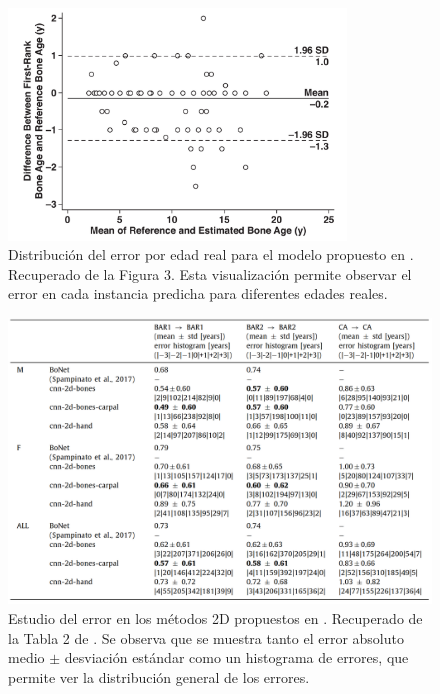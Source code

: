 \begin{figure}[h]
    \centering
    \includegraphics[width=0.8\textwidth]{capitulos/cap_03/imagenes/error_distribution.png}
    \caption[
        Distribución del error por edad real para el modelo propuesto en \cite{kim2017}. 
    ]{
        Distribución del error por edad real para el modelo propuesto en \cite{kim2017}. 
        Recuperado de la Figura 3. 
        Esta visualización permite observar el error en cada instancia predicha para diferentes edades reales. 
    }
    \label{fig:error_distribution_by_age}
\end{figure}

\begin{figure}[h]
    \centering
    \includegraphics[width=\textwidth]{capitulos/cap_03/imagenes/error_study.png}
    \caption[
        Estudio del error en los métodos 2D propuestos en \cite{stern2019}.
    ]{
        Estudio del error en los métodos 2D propuestos en \cite{stern2019}. 
        Recuperado de la Tabla 2 de \cite{stern2019}.
        Se observa que se muestra tanto el error absoluto medio $\pm$ desviación estándar como un 
        histograma de errores, que permite ver la distribución general de los errores. 
    }
    \label{fig:error_study_stern2019}
\end{figure}


